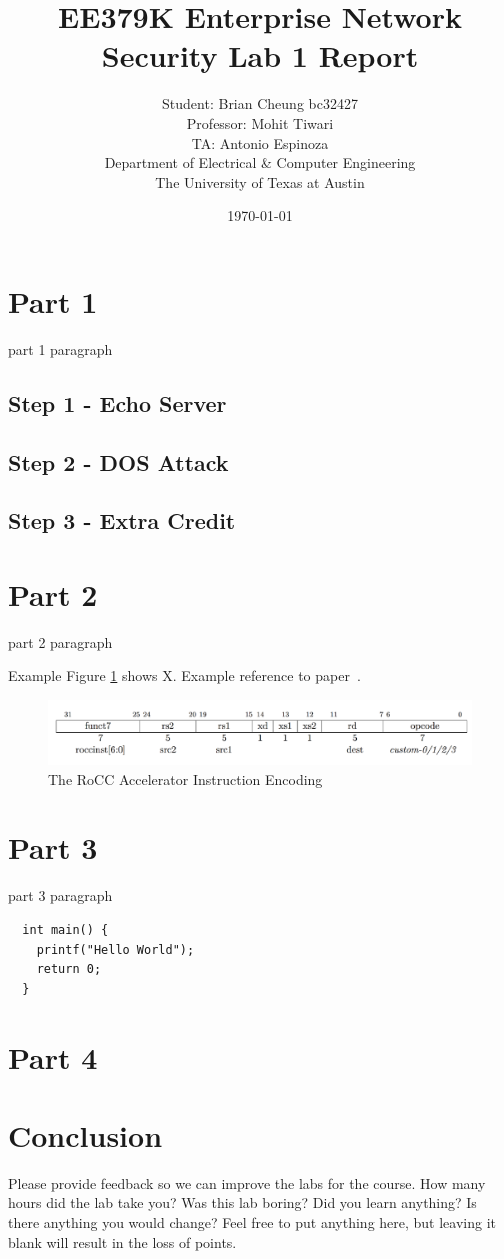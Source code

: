 \documentclass[11pt]{article}
\author{Student: Brian Cheung bc32427 \\ Professor: Mohit Tiwari \\ TA: Antonio Espinoza \\ Department of Electrical \& Computer Engineering \\ The University of Texas at Austin}
\date{\today}
\title{EE379K Enterprise Network Security Lab 1 Report}
\begin{document}
\maketitle
\section{Part 1}
\label{sec:part-1}
part 1 paragraph
\subsection{Step 1 - Echo Server}
\subsection{Step 2 - DOS Attack}
\subsection{Step 3 - Extra Credit}

\section{Part 2}
\label{sec:part-2}
part 2 paragraph

Example Figure \ref{fig:rocc-encoding} shows X. Example reference to paper~\cite{Brasser17}.

\begin{figure}[htbp]
\centering
\includegraphics[width=.9\linewidth]{./rocc-encoding.png}
\caption{\label{fig:rocc-encoding}
The RoCC Accelerator Instruction Encoding}
\end{figure}
\section{Part 3}

\label{sec:part-3}
part 3 paragraph

\begin{verbatim}
  int main() {
    printf("Hello World");
    return 0;
  }
\end{verbatim}

\section{Part 4}
\label{sec:part-4}

\section{Conclusion}
\label{sec:conclusion}
Please provide feedback so we can improve the labs for the course. How many
hours did the lab take you? Was this lab boring? Did you learn anything? Is
there anything you would change? Feel free to put anything here, but leaving it
blank will result in the loss of points.



\end{document}
